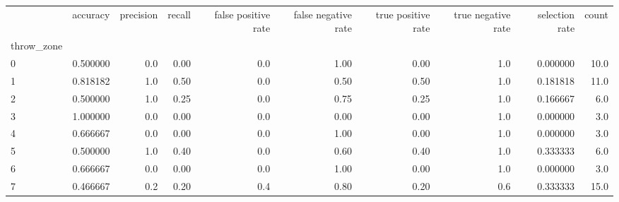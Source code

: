\begin{tabular}{lrrrrrrrrr}
\toprule
{} &  accuracy &  precision &  recall &  false positive rate &  false negative rate &  true positive rate &  true negative rate &  selection rate &  count \\
throw\_zone &           &            &         &                      &                      &                     &                     &                 &        \\
\midrule
0          &  0.500000 &        0.0 &    0.00 &                  0.0 &                 1.00 &                0.00 &                 1.0 &        0.000000 &   10.0 \\
1          &  0.818182 &        1.0 &    0.50 &                  0.0 &                 0.50 &                0.50 &                 1.0 &        0.181818 &   11.0 \\
2          &  0.500000 &        1.0 &    0.25 &                  0.0 &                 0.75 &                0.25 &                 1.0 &        0.166667 &    6.0 \\
3          &  1.000000 &        0.0 &    0.00 &                  0.0 &                 0.00 &                0.00 &                 1.0 &        0.000000 &    3.0 \\
4          &  0.666667 &        0.0 &    0.00 &                  0.0 &                 1.00 &                0.00 &                 1.0 &        0.000000 &    3.0 \\
5          &  0.500000 &        1.0 &    0.40 &                  0.0 &                 0.60 &                0.40 &                 1.0 &        0.333333 &    6.0 \\
6          &  0.666667 &        0.0 &    0.00 &                  0.0 &                 1.00 &                0.00 &                 1.0 &        0.000000 &    3.0 \\
7          &  0.466667 &        0.2 &    0.20 &                  0.4 &                 0.80 &                0.20 &                 0.6 &        0.333333 &   15.0 \\
\bottomrule
\end{tabular}
